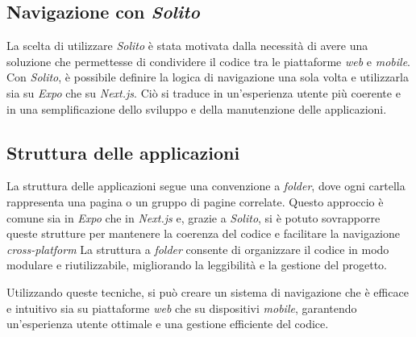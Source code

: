 \subsection*{Navigazione con \textit{Solito}}
La scelta di utilizzare \textit{Solito} è stata motivata dalla necessità di avere una soluzione che permettesse di condividere il codice tra le piattaforme \textit{web} e \textit{mobile}.
Con \textit{Solito}, è possibile definire la logica di navigazione una sola volta e utilizzarla sia su \textit{Expo} che su \textit{Next.js}. Ciò si traduce in un'esperienza utente più coerente e in una semplificazione dello sviluppo e della manutenzione delle applicazioni.

\subsection*{Struttura delle applicazioni}
La struttura delle applicazioni segue una convenzione a \textit{folder}, dove ogni cartella rappresenta una pagina o un gruppo di pagine correlate.
Questo approccio è comune sia in \textit{Expo} che in \textit{Next.js} e, grazie a \textit{Solito}, si è potuto sovrapporre queste strutture per mantenere la coerenza del codice e facilitare la navigazione \textit{cross-platform}
 La struttura a \textit{folder} consente di organizzare il codice in modo modulare e riutilizzabile, migliorando la leggibilità e la gestione del progetto.

Utilizzando queste tecniche, si può creare un sistema di navigazione che è efficace e intuitivo sia su piattaforme \textit{web} che su dispositivi \textit{mobile}, garantendo un'esperienza utente ottimale e una gestione efficiente del codice.


\newpage